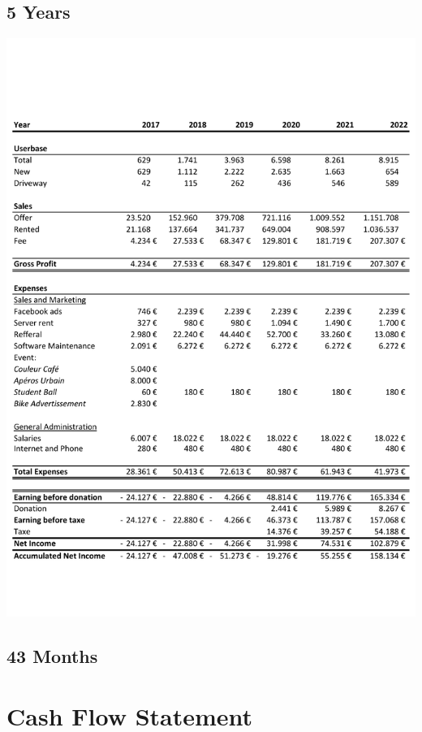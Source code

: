 \documentclass[12pt,a4paper,oneside]{book}
\begin{document}
\section{5 Years}
\begin{center}
\includegraphics[trim={0 3cm 0 4.2cm},clip,keepaspectratio=true,width=\textwidth]{../sheets/income5.pdf}
\end{center}
\section{43 Months}


\chapter{Cash Flow Statement}
\label{cfs}
\end{document}

